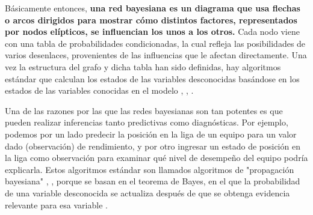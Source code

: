 Básicamente entonces, \textbf{una red bayesiana es un diagrama que 
usa flechas o arcos dirigidos para mostrar cómo distintos factores, representados por nodos elípticos, se 
influencian los unos a los otros.} Cada nodo viene con una tabla de probabilidades condicionadas, la cual refleja las 
posibilidades de varios desenlaces, provenientes de las influencias que le afectan directamente. Una vez 
la estructura del grafo y dicha tabla han sido definidas, hay algoritmos estándar que 
calculan los estados de las variables desconocidas basándose en los estados de las variables conocidas en el
modelo \cite{learning-algorithms-BN-comparison}, \cite{BN-achilles-heel}, \cite{different-algorithmic-schemes}.

Una de las razones por las que las redes bayesianas son tan potentes es que pueden realizar inferencias 
tanto predictivas como diagnósticas. Por ejemplo, podemos por un lado predecir la posición en la liga de un equipo para 
un valor dado (observación) de rendimiento, y por otro ingresar un estado de posición en la 
liga como observación para examinar qué nivel de desempeño del equipo podría explicarla. Estos algoritmos estándar son
llamados algoritmos de "propagación bayesiana" \cite{Cano2004}, \cite{more-algorithms}, \cite{back-prop} porque se basan en el teorema de Bayes, en el que la 
probabilidad de una variable desconocida se actualiza después de que se obtenga evidencia relevante para esa variable \cite{prop-alg}.

